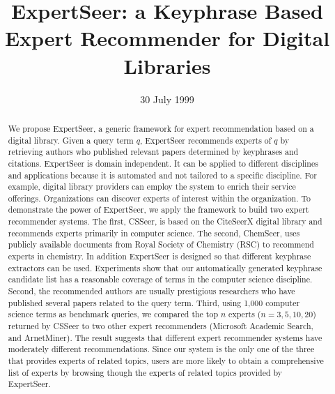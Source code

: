 \documentclass{sig-alternate}
\begin{document}
\title{ExpertSeer: a Keyphrase Based Expert Recommender for Digital Libraries}


\date{30 July 1999}

\maketitle
\begin{abstract}

We propose ExpertSeer, a generic framework for expert
recommendation based on a digital library.  Given a query term $q$, ExpertSeer
recommends experts of $q$ by retrieving authors who published relevant papers determined by keyphrases and citations.
ExpertSeer is domain independent.  It can be applied to different disciplines and
applications because it is automated and not tailored to a specific
discipline.  For example, digital library providers can employ the
system to enrich their service offerings.  Organizations can discover experts of interest within the organization.  To demonstrate
the power of ExpertSeer, we apply the framework to build two expert recommender
systems.  The first, CSSeer, is based on the CiteSeerX digital library and recommends
experts primarily in computer science.  The second, ChemSeer, uses publicly
available documents from Royal Society of Chemistry (RSC) to recommend experts
in chemistry.
In addition ExpertSeer is designed so that different keyphrase extractors can be used.
Experiments show that our automatically generated keyphrase candidate list has a reasonable coverage of terms
in the computer science discipline.  Second, the recommended authors are usually
prestigious researchers who have published several papers related to the query term.
Third, using 1,000 computer science terms as benchmark queries, we compared the
top $n$ experts ($n=3,5,10,20$) returned by CSSeer to two other expert
recommenders (Microsoft Academic Search, and ArnetMiner).  The result suggests
that different expert recommender systems have moderately different recommendations.
Since our system is the only one of the three that provides experts of related
topics, users are more likely to obtain a comprehensive list of experts by
browsing though the experts of related topics provided by ExpertSeer.

\end{abstract}
\end{document}
